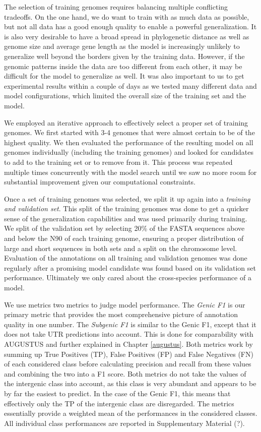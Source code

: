 \documentclass{bioinfo}
\begin{document}
\begin{methods}
The selection of training genomes requires balancing multiple conflicting tradeoffs. On the one hand, we do want to train with as much data as possible, but not all data has a good enough quality to enable a powerful generalization. It is also very desirable to have a broad spread in phylogenetic distance as well as genome size and average gene length as the model is increasingly unlikely to generalize well beyond the borders given by the training data. However, if the genomic patterns inside the data are too different from each other, it may be difficult for the model to generalize as well. It was also important to us to get experimental results within a couple of days as we tested many different data and model configurations, which limited the overall size of the training set and the model. 
	
We employed an iterative approach to effectively select a proper set of training genomes. We first started with 3-4 genomes that were almost certain to be of the highest quality. We then evaluated the performance of the resulting model on all genomes individually (including the training genomes) and looked for candidates to add to the training set or to remove from it. This process was repeated multiple times concurrently with the model search until we saw no more room for substantial improvement given our computational constraints.

Once a set of training genomes was selected, we split it up again into a {\it training and validation set}. This split of the training genomes was done to get a quicker sense of the generalization capabilities and was used primarily during training. We split of the validation set by selecting 20\% of the FASTA sequences above and below the N90 of each training genome, ensuring a proper distribution of large and short sequences in both sets and a split on the chromosome level. Evaluation of the annotations on all training and validation genomes was done regularly after a promising model candidate was found based on its validation set performance. Ultimately we only cared about the cross-species performance of a model.

We use metrics two metrics to judge model performance. The {\it Genic F1} is our primary metric that provides the most comprehensive picture of annotation quality in one number. The {\it Subgenic F1} is similar to the Genic F1, except that it does not take UTR predictions into account. This is done for comparability with AUGUSTUS and further explained in Chapter \ref{augustus}. Both metrics work by summing up True Positives (TP), False Positives (FP) and False Negatives (FN) of each considered class before calculating precision and recall from these values and combining the two into a F1 score. Both metrics do not take the values of the intergenic class into account, as this class is very abundant and appears to be by far the easiest to predict. In the case of the Genic F1, this means that effectively only the TP of the intergenic class are disregarded. The metrics essentially provide a weighted mean of the performances in the considered classes. All individual class performances are reported in Supplementary Material (?). 
	

\end{methods}
\end{document}
